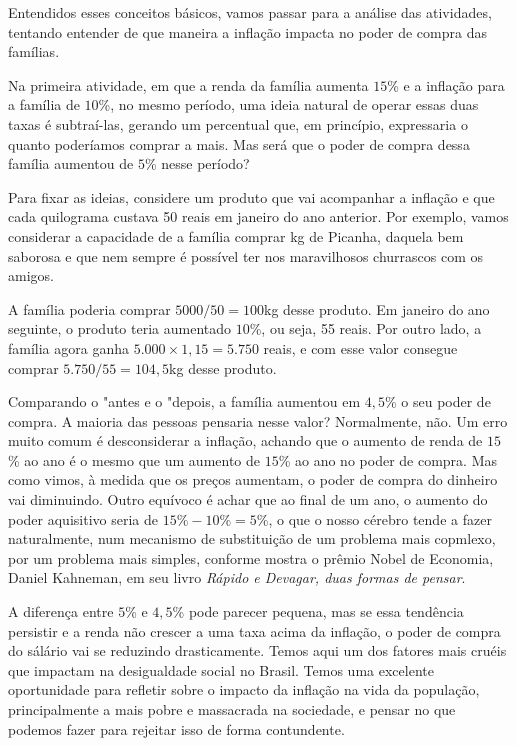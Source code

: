 Entendidos esses conceitos básicos, vamos passar para a análise das atividades, tentando entender de que maneira a inflação impacta no poder de compra das famílias.

Na primeira atividade, em que a renda da família aumenta $15$\% e a inflação para a família de $10$\%, no mesmo período, uma ideia natural de operar essas duas taxas é subtraí-las, gerando um percentual que, em princípio, expressaria o quanto poderíamos comprar a mais. Mas será que o poder de compra dessa família aumentou de $5$\% nesse período?

Para fixar as ideias, considere um produto que vai acompanhar a inflação e que cada quilograma custava 50 reais em janeiro do ano anterior. Por exemplo, vamos considerar a capacidade de a família comprar kg de Picanha, daquela bem saborosa e que nem sempre é possível ter nos maravilhosos churrascos com os amigos.

A família poderia comprar $5000/50=100$kg desse produto. Em janeiro do ano seguinte, o produto teria aumentado $10$\%, ou seja, 55 reais. Por outro lado, a família agora ganha $5.000\times1{,}15=5.750$ reais, e com esse valor consegue comprar $5.750/55=104{,}5$kg desse produto.

Comparando o "antes e o "depois, a família aumentou em $4{,}5$\% o seu poder de compra. A maioria das pessoas pensaria nesse valor? Normalmente, não.  Um erro muito comum é desconsiderar a inflação, achando que o aumento de renda de $15$\% ao ano é o mesmo que um aumento de $15$\% ao ano no poder de compra. Mas como vimos, à medida que os preços aumentam, o poder de compra do dinheiro vai diminuindo. Outro equívoco é achar que ao final de um ano, o aumento do poder aquisitivo seria de $15\%-10\%=5\%$, o que o nosso cérebro tende a fazer naturalmente, num mecanismo de substituição de um problema mais copmlexo, por um problema mais simples, conforme mostra o prêmio Nobel de Economia, Daniel Kahneman, em seu livro \textit{Rápido e Devagar, duas formas de pensar}.

A diferença entre $5$\% e $4{,}5$\% pode parecer pequena, mas se essa tendência persistir e a renda não crescer a uma taxa acima da inflação, o poder de compra do sálário vai se reduzindo drasticamente. Temos aqui um dos fatores mais cruéis que impactam na desigualdade social no Brasil. Temos uma excelente oportunidade para refletir sobre o impacto da inflação na vida da população, principalmente a mais pobre e massacrada na sociedade, e pensar no que podemos fazer para rejeitar isso de forma contundente.

